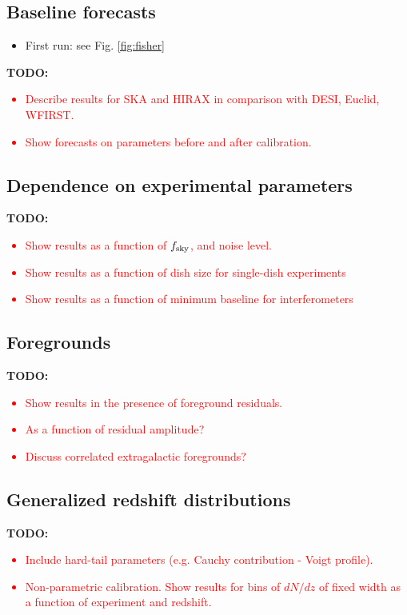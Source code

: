 \documentclass[prd,twocolumn]{revtex4}
\newcommand{\TODO}[1]{{\bf TODO:} \textcolor{red}{#1}}
\begin{document}
  \subsection{Baseline forecasts} \label{ssec:results.baseline}
    \begin{itemize}
     \item First run: see Fig. \ref{fig:fisher}
    \end{itemize}

    \TODO{
      \begin{itemize}
        \item Describe results for SKA and HIRAX in comparison with DESI, Euclid, WFIRST.
        \item Show forecasts on parameters before and after calibration.
      \end{itemize}
    }

  \subsection{Dependence on experimental parameters} \label{ssec:results.params}
    \TODO{
      \begin{itemize}
        \item Show results as a function of $f_{\rm sky}$, and noise level.
        \item Show results as a function of dish size for single-dish experiments
        \item Show results as a function of minimum baseline for interferometers
      \end{itemize}
    }

  \subsection{Foregrounds} \label{ssec:results.foregrounds}
    \TODO{
      \begin{itemize}
        \item Show results in the presence of foreground residuals.
        \item As a function of residual amplitude?
        \item Discuss correlated extragalactic foregrounds?
      \end{itemize}
    }

  \subsection{Generalized redshift distributions} \label{ssec:results.outliers}
    \TODO{
      \begin{itemize}
        \item Include hard-tail parameters (e.g. Cauchy contribution - Voigt profile).
        \item Non-parametric calibration. Show results for bins of $dN/dz$ of fixed
          width as a function of experiment and redshift.
      \end{itemize}
    }
    
\end{document}
